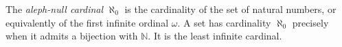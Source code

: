 
The \emph{aleph-null cardinal} $\aleph_0$ is the cardinality of the set of natural numbers, or equivalently of the first infinite ordinal $\omega$. A set has cardinality $\aleph_0$ precisely when it admits a bijection with $\mathbb N$. It is the least infinite cardinal.
